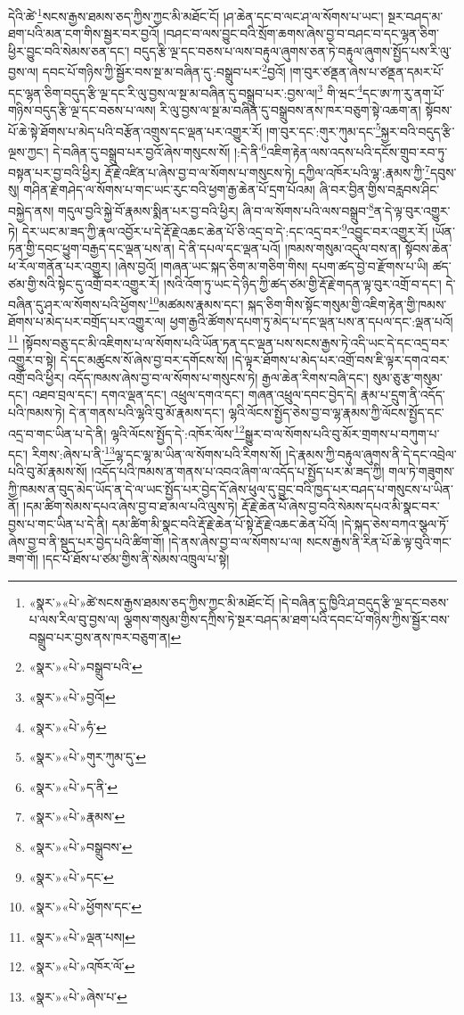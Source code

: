 དེའི་ཚེ་\footnote{«སྣར་»«པེ་»ཚེ་སངས་རྒྱས་ཐམས་ཅད་ཀྱིས་ཀྱང་མི་མཐོང་ངོ། །དེ་བཞིན་དུ་ཁྱིའི་ཤ་བདུད་རྩི་ལྔ་དང་བཅས་པ་ལས་རིལ་བུ་བྱས་ལ། ལྕགས་གསུམ་གྱིས་དཀྲིས་ཏེ་སྔར་བཤད་མ་ཐག་པའི་དབང་པོ་གཉིས་ཀྱིས་སྦྱོར་བས་བསྒྲུབ་པར་བྱས་ནས་ཁར་བཅུག་ན། }སངས་རྒྱས་ཐམས་ཅད་ཀྱིས་ཀྱང་མི་མཐོང་ངོ། །ཤ་ཆེན་དང་བ་ལང་ཤ་ལ་སོགས་པ་ཡང་། སྔར་བཤད་མ་ཐག་པའི་མན་ངག་གིས་སྦྱར་བར་བྱའོ། །བཤང་བ་ལས་བྱུང་བའི་སྲོག་ཆགས་ཞེས་བྱ་བ་བཤང་བ་དང་ལྷན་ཅིག་ཕྱིར་བྱུང་བའི་སེམས་ཅན་དང་། བདུད་རྩི་ལྔ་དང་བཅས་པ་ལས་བརྟུལ་ཞུགས་ཅན་ཏེ་བརྟུལ་ཞུགས་སྤྱོད་པས་རི་ལུ་བྱས་ལ། དབང་པོ་གཉིས་ཀྱི་སྦྱོར་བས་སྔ་མ་བཞིན་དུ་:བསྒྲུབ་པར་\footnote{«སྣར་»«པེ་»བསྒྲུབ་པའི་}བྱའོ། །ག་བུར་ཙནྡན་ཞེས་པ་ཙནྡན་དམར་པོ་དང་ལྷན་ཅིག་བདུད་རྩི་ལྔ་དང་རི་ལུ་བྱས་ལ་སྔ་མ་བཞིན་དུ་བསྒྲུབ་པར་:བྱས་ལ།\footnote{«སྣར་»«པེ་»བྱའོ།} གི་ཝང་\footnote{«སྣར་»«པེ་»ཧཾ་}དང་ཨ་ཀ་རུ་ནག་པོ་གཉིས་བདུད་རྩི་ལྔ་དང་བཅས་པ་ལས། རི་ལུ་བྱས་ལ་སྔ་མ་བཞིན་དུ་བསྒྲུབས་ནས་ཁར་བཅུག་སྟེ་འཆག་ན། སྟོབས་པོ་ཆེ་སྟེ་ཐོགས་པ་མེད་པའི་བརྩོན་འགྲུས་དང་ལྡན་པར་འགྱུར་རོ། །ག་བུར་དང་:གུར་ཀུམ་དང་\footnote{«སྣར་»«པེ་»གུར་ཀུམ་དུ་}སྐྱར་བའི་བདུད་རྩི་ལྔས་ཀྱང་། དེ་བཞིན་དུ་བསྒྲུབ་པར་བྱའོ་ཞེས་གསུངས་སོ། །:དེ་ནི་\footnote{«སྣར་»«པེ་»ད་ནི་}འཇིག་རྟེན་ལས་འདས་པའི་དངོས་གྲུབ་རབ་ཏུ་བསྟན་པར་བྱ་བའི་ཕྱིར། རྡོ་རྗེ་འཛིན་པ་ཞེས་བྱ་བ་ལ་སོགས་པ་གསུངས་ཏེ། དཀྱིལ་འཁོར་པའི་ལྷ་:རྣམས་ཀྱི་\footnote{«སྣར་»«པེ་»རྣམས་}དབུས་སུ། གཤིན་རྗེ་གཤེད་ལ་སོགས་པ་གང་ཡང་རུང་བའི་ཕྱག་རྒྱ་ཆེན་པོ་དྲག་པོའམ། ཞི་བར་བྱིན་གྱིས་བརླབས་ཤིང་བསྐྱེད་ནས། གདུལ་བྱའི་སྐྱེ་བོ་རྣམས་སྨིན་པར་བྱ་བའི་ཕྱིར། ཞི་བ་ལ་སོགས་པའི་ལས་བསྒྲུབ་\footnote{«སྣར་»«པེ་»བསྒྲུབས་}ན་དེ་ལྟ་བུར་འགྱུར་ཏེ། དེར་ཡང་མ་ཟད་ཀྱི་རྣལ་འབྱོར་པ་དེ་རྡོ་རྗེ་འཆང་ཆེན་པོ་ཅི་འདྲ་བ་དེ་:དང་འདྲ་བར་\footnote{«སྣར་»«པེ་»དང་}འབྱུང་བར་འགྱུར་རོ། །ཡོན་ཏན་གྱི་དབང་ཕྱུག་བརྒྱད་དང་ལྡན་པས་ན། དེ་ནི་དཔལ་དང་ལྡན་པའོ། །ཁམས་གསུམ་འདུལ་བས་ན། སྟོབས་ཆེན་ཕ་རོལ་གནོན་པར་འགྱུར། །ཞེས་བྱའོ། །གཞན་ཡང་སྐད་ཅིག་མ་གཅིག་གིས། དཔག་ཚད་བྱེ་བ་རྫོགས་པ་ཡི། ཚད་ཙམ་གྱི་སའི་སྟེང་དུ་འགྲོ་བར་འགྱུར་རོ། །སའི་འོག་ཏུ་ཡང་དེ་ཉིད་ཀྱི་ཚད་ཙམ་གྱི་རྡོ་རྗེ་གདན་ལྟ་བུར་འགྲོ་བ་དང་། དེ་བཞིན་དུ་ཤར་ལ་སོགས་པའི་ཕྱོགས་\footnote{«སྣར་»«པེ་»ཕྱོགས་དང་}མཚམས་རྣམས་དང་། སྐད་ཅིག་གིས་སྟོང་གསུམ་གྱི་འཇིག་རྟེན་གྱི་ཁམས་ཐོགས་པ་མེད་པར་བགྲོད་པར་འགྱུར་ལ། ཕྱག་རྒྱའི་ཚོགས་དཔག་ཏུ་མེད་པ་དང་ལྡན་པས་ན་དཔལ་དང་:ལྡན་པའོ།\footnote{«སྣར་»«པེ་»ལྡན་པས།} །སྟོབས་བཅུ་དང་མི་འཇིགས་པ་ལ་སོགས་པའི་ཡོན་ཏན་དང་ལྡན་པས་སངས་རྒྱས་ཏེ་འདི་ཡང་དེ་དང་འདྲ་བར་འགྱུར་བ་སྟེ། དེ་དང་མཚུངས་སོ་ཞེས་བྱ་བར་དགོངས་སོ། །དེ་ལྟར་ཐོགས་པ་མེད་པར་འགྲོ་བས་ཇི་ལྟར་དགའ་བར་འགྲོ་བའི་ཕྱིར། འདོད་ཁམས་ཞེས་བྱ་བ་ལ་སོགས་པ་གསུངས་ཏེ། རྒྱལ་ཆེན་རིགས་བཞི་དང་། སུམ་ཅུ་རྩ་གསུམ་དང་། འཐབ་བྲལ་དང་། དགའ་ལྡན་དང་། འཕྲུལ་དགའ་དང་། གཞན་འཕྲུལ་དབང་བྱེད་དེ། རྣམ་པ་དྲུག་ནི་འདོད་པའི་ཁམས་ཏེ། དེ་ན་གནས་པའི་ལྷའི་བུ་མོ་རྣམས་དང་། ལྷའི་ལོངས་སྤྱོད་ཅེས་བྱ་བ་ལྷ་རྣམས་ཀྱི་ལོངས་སྤྱོད་དང་འདྲ་བ་གང་ཡིན་པ་དེ་ནི། ལྷའི་ལོངས་སྤྱོད་དེ་:འཁོར་ལོས་\footnote{«སྣར་»«པེ་»འཁོར་ལོ་}སྒྱུར་བ་ལ་སོགས་པའི་བུ་མོར་གྲགས་པ་བཀུག་པ་དང་། རིགས་:ཞེས་པ་ནི་\footnote{«སྣར་»«པེ་»ཞེས་པ་}ལྷ་དང་ལྷ་མ་ཡིན་ལ་སོགས་པའི་རིགས་སོ། །དེ་རྣམས་ཀྱི་བརྟུལ་ཞུགས་ནི་དེ་དང་འབྲེལ་པའི་བུ་མོ་རྣམས་སོ། །འདོད་པའི་ཁམས་ན་གནས་པ་འབའ་ཞིག་ལ་འདོད་པ་སྤྱོད་པར་མ་ཟད་ཀྱི། གལ་ཏེ་གཟུགས་ཀྱི་ཁམས་ན་བུད་མེད་ཡོད་ན་དེ་ལ་ཡང་སྤྱོད་པར་བྱེད་དོ་ཞེས་ཕུལ་དུ་བྱུང་བའི་ཁྱད་པར་བཤད་པ་གསུངས་པ་ཡིན་ནོ། །དམ་ཚིག་སེམས་དཔའ་ཞེས་བྱ་བ་ཐ་མལ་པའི་ལུས་ཏེ། རྡོ་རྗེ་ཆེན་པོ་ཞེས་བྱ་བའི་སེམས་དཔའ་མི་སྣང་བར་བྱས་པ་གང་ཡིན་པ་དེ་ནི། དམ་ཚིག་མི་སྣང་བའི་རྡོ་རྗེ་ཆེན་པོ་སྟེ་རྡོ་རྗེ་འཆང་ཆེན་པོའོ། །དེ་སྐད་ཅེས་བཀའ་སྩལ་ཏོ་ཞེས་བྱ་བ་ནི་སྡུད་པར་བྱེད་པའི་ཚིག་གོ། །དེ་ནས་ཞེས་བྱ་བ་ལ་སོགས་པ་ལ། སངས་རྒྱས་ནི་རིན་པོ་ཆེ་ལྟ་བུའི་གང་ཟག་གོ། །དང་པོ་ཐོས་པ་ཙམ་གྱིས་ནི་སེམས་འཁྲུལ་པ་སྟེ། 